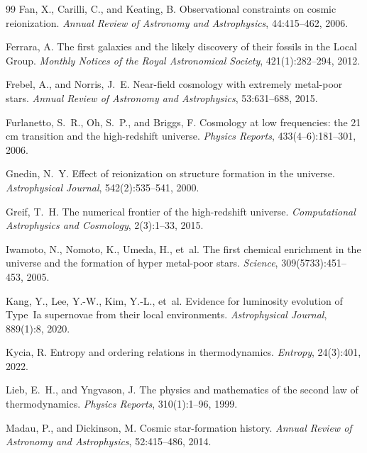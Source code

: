 \documentclass[12pt, a4paper]{article}
\theoremstyle{definition}
\begin{document}
\begin{thebibliography}{99}
Fan, X., Carilli, C., and Keating, B.
\newblock Observational constraints on cosmic reionization.
\newblock \textit{Annual Review of Astronomy and Astrophysics}, 44:415--462, 2006.

Ferrara, A.
\newblock The first galaxies and the likely discovery of their fossils in the Local Group.
\newblock \textit{Monthly Notices of the Royal Astronomical Society}, 421(1):282--294, 2012.

Frebel, A., and Norris, J.~E.
\newblock Near-field cosmology with extremely metal-poor stars.
\newblock \textit{Annual Review of Astronomy and Astrophysics}, 53:631--688, 2015.

Furlanetto, S.~R., Oh, S.~P., and Briggs, F.
\newblock Cosmology at low frequencies: the 21\,cm transition and the high-redshift universe.
\newblock \textit{Physics Reports}, 433(4--6):181--301, 2006.

Gnedin, N.~Y.
\newblock Effect of reionization on structure formation in the universe.
\newblock \textit{Astrophysical Journal}, 542(2):535--541, 2000.

Greif, T.~H.
\newblock The numerical frontier of the high-redshift universe.
\newblock \textit{Computational Astrophysics and Cosmology}, 2(3):1--33, 2015.

Iwamoto, N., Nomoto, K., Umeda, H., et~al.
\newblock The first chemical enrichment in the universe and the formation of
  hyper metal-poor stars.
\newblock \textit{Science}, 309(5733):451--453, 2005.

Kang, Y., Lee, Y.-W., Kim, Y.-L., et~al.
\newblock Evidence for luminosity evolution of Type~Ia supernovae from their local environments.
\newblock \textit{Astrophysical Journal}, 889(1):8, 2020.

Kycia, R.
\newblock Entropy and ordering relations in thermodynamics.
\newblock \textit{Entropy}, 24(3):401, 2022.

Lieb, E.~H., and Yngvason, J.
\newblock The physics and mathematics of the second law of thermodynamics.
\newblock \textit{Physics Reports}, 310(1):1--96, 1999.

Madau, P., and Dickinson, M.
\newblock Cosmic star-formation history.
\newblock \textit{Annual Review of Astronomy and Astrophysics}, 52:415--486, 2014.


\end{thebibliography}
\end{document}
